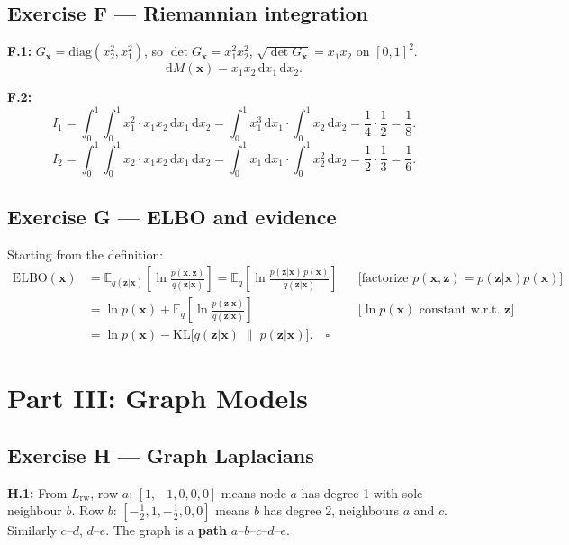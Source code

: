 \documentclass[12pt,a4paper]{article}
\newcommand{\KL}{\mathrm{KL}}
\newcommand{\E}{\mathbb{E}}
\newcommand{\ELBO}{\mathrm{ELBO}}
\begin{document}
\subsection*{Exercise F --- Riemannian integration}

\textbf{F.1:} $G_\mathbf{x}=\mathrm{diag}(x_2^2,x_1^2)$, so $\det G_\mathbf{x}=x_1^2 x_2^2$, $\sqrt{\det G_\mathbf{x}}=x_1 x_2$ on $[0,1]^2$.
\[
  \boxed{\mathrm{d}M(\mathbf{x})=x_1 x_2\,\mathrm{d}x_1\,\mathrm{d}x_2.}
\]

\textbf{F.2:}
\[
  I_1=\int_0^1\!\int_0^1 x_1^2\cdot x_1 x_2\,\mathrm{d}x_1\,\mathrm{d}x_2
  =\int_0^1 x_1^3\,\mathrm{d}x_1\cdot\int_0^1 x_2\,\mathrm{d}x_2
  =\frac{1}{4}\cdot\frac{1}{2}=\boxed{\frac{1}{8}}.
\]
\[
  I_2=\int_0^1\!\int_0^1 x_2\cdot x_1 x_2\,\mathrm{d}x_1\,\mathrm{d}x_2
  =\int_0^1 x_1\,\mathrm{d}x_1\cdot\int_0^1 x_2^2\,\mathrm{d}x_2
  =\frac{1}{2}\cdot\frac{1}{3}=\boxed{\frac{1}{6}}.
\]

\subsection*{Exercise G --- ELBO and evidence}

Starting from the definition:
\begin{align*}
  \ELBO(\mathbf{x})
  &= \E_{q(\mathbf{z}|\mathbf{x})}\!\left[\ln\frac{p(\mathbf{x},\mathbf{z})}{q(\mathbf{z}|\mathbf{x})}\right]
   = \E_q\!\left[\ln\frac{p(\mathbf{z}|\mathbf{x})\,p(\mathbf{x})}{q(\mathbf{z}|\mathbf{x})}\right]
   &&\text{[factorize $p(\mathbf{x},\mathbf{z})=p(\mathbf{z}|\mathbf{x})p(\mathbf{x})$]}\\
  &= \ln p(\mathbf{x}) + \E_q\!\left[\ln\frac{p(\mathbf{z}|\mathbf{x})}{q(\mathbf{z}|\mathbf{x})}\right]
   &&\text{[$\ln p(\mathbf{x})$ constant w.r.t.\ $\mathbf{z}$]}\\
  &= \ln p(\mathbf{x}) - \KL\!\bigl[q(\mathbf{z}|\mathbf{x})\;\|\;p(\mathbf{z}|\mathbf{x})\bigr].\quad\square
\end{align*}

\newpage
\section*{Part III: Graph Models}

\subsection*{Exercise H --- Graph Laplacians}

\textbf{H.1:} From $L_{\mathrm{rw}}$, row $a$: $[1,-1,0,0,0]$ means node $a$ has degree 1 with sole neighbour $b$.
Row $b$: $[-\frac{1}{2},1,-\frac{1}{2},0,0]$ means $b$ has degree 2, neighbours $a$ and $c$.
Similarly $c$--$d$, $d$--$e$.  The graph is a \textbf{path} $a$--$b$--$c$--$d$--$e$.
\end{document}
